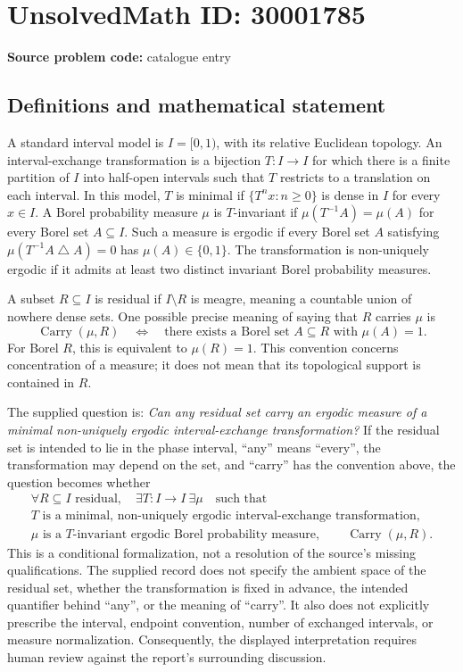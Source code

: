 \documentclass[11pt]{article}
\begin{document}
\section*{UnsolvedMath ID: 30001785}
\textbf{Source problem code:} catalogue entry
\subsection{Definitions and mathematical statement}
A standard interval model is \(I=[0,1)\), with its relative Euclidean topology. An interval-exchange transformation is a bijection \(T:I\to I\) for which there is a finite partition of \(I\) into half-open intervals such that \(T\) restricts to a translation on each interval. In this model, \(T\) is minimal if \(\{T^n x:n\geq 0\}\) is dense in \(I\) for every \(x\in I\). A Borel probability measure \(\mu\) is \(T\)-invariant if \(\mu(T^{-1}A)=\mu(A)\) for every Borel set \(A\subseteq I\). Such a measure is ergodic if every Borel set \(A\) satisfying \(\mu(T^{-1}A\mathbin{\triangle}A)=0\) has \(\mu(A)\in\{0,1\}\). The transformation is non-uniquely ergodic if it admits at least two distinct invariant Borel probability measures.

A subset \(R\subseteq I\) is residual if \(I\setminus R\) is meagre, meaning a countable union of nowhere dense sets. One possible precise meaning of saying that \(R\) carries \(\mu\) is
\[
\operatorname{Carry}(\mu,R)\quad\Longleftrightarrow\quad
\text{there exists a Borel set }A\subseteq R\text{ with }\mu(A)=1.
\]
For Borel \(R\), this is equivalent to \(\mu(R)=1\). This convention concerns concentration of a measure; it does not mean that its topological support is contained in \(R\).

The supplied question is: \emph{Can any residual set carry an ergodic measure of a minimal non-uniquely ergodic interval-exchange transformation?} If the residual set is intended to lie in the phase interval, ``any'' means ``every'', the transformation may depend on the set, and ``carry'' has the convention above, the question becomes whether
\[
\begin{gathered}
\forall R\subseteq I\text{ residual},\quad
\exists T:I\to I\ \exists\mu\quad\text{such that}\\
T\text{ is a minimal, non-uniquely ergodic interval-exchange transformation},\\
\mu\text{ is a }T\text{-invariant ergodic Borel probability measure},
\qquad \operatorname{Carry}(\mu,R).
\end{gathered}
\]
This is a conditional formalization, not a resolution of the source's missing qualifications. The supplied record does not specify the ambient space of the residual set, whether the transformation is fixed in advance, the intended quantifier behind ``any'', or the meaning of ``carry''. It also does not explicitly prescribe the interval, endpoint convention, number of exchanged intervals, or measure normalization. Consequently, the displayed interpretation requires human review against the report's surrounding discussion.
\end{document}
